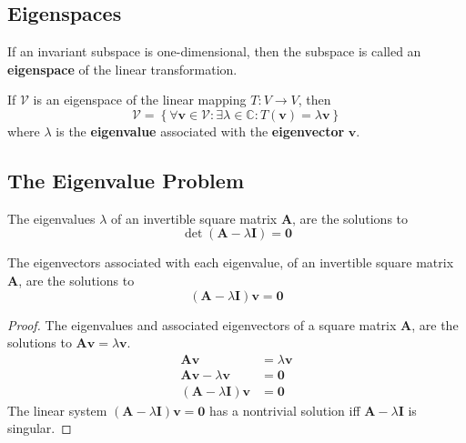 \documentclass{article}
\begin{document}
\subsection{Eigenspaces}
\begin{definition}
    If an invariant subspace is one-dimensional, then the subspace is
    called an \textbf{eigenspace} of the linear transformation.
\end{definition}
\begin{theorem}
    If \(\mathcal{V}\) is an eigenspace of the linear mapping
    \(T: V \rightarrow V\), then
    \begin{equation*}
        \mathcal{V} = \left\{ \forall \symbf{v}\in \mathcal{V}:\exists \lambda \in \mathbb{C}:T\left(\symbf{v}\right)=\lambda \symbf{v} \right\}
    \end{equation*}
    where \(\lambda\) is the \textbf{eigenvalue} associated with the
    \textbf{eigenvector} \(\symbf{v}\).
\end{theorem}
\subsection{The Eigenvalue Problem}
\begin{theorem}
    The eigenvalues \(\lambda\) of an invertible square matrix
    \(\symbf{A}\), are the solutions to
    \begin{equation*}
        \det{\left( \symbf{A} - \lambda \symbf{I} \right)}=\symbf{0}
    \end{equation*}
\end{theorem}
\begin{theorem}
    The eigenvectors associated with each eigenvalue, of an invertible
    square matrix \(\symbf{A}\), are the solutions to
    \begin{equation*}
        \left( \symbf{A} - \lambda \symbf{I} \right) \symbf{v}=\symbf{0}
    \end{equation*}
\end{theorem}
\begin{proof}
    The eigenvalues and associated eigenvectors of a square matrix
    \(\symbf{A}\), are the solutions to
    \(\symbf{A}\symbf{v}=\lambda \symbf{v}\).
    \begin{align*}
        \symbf{A}\symbf{v}                                     & =\lambda \symbf{v} \\
        \symbf{A}\symbf{v} - \lambda \symbf{v}                 & =\symbf{0}         \\
        \left( \symbf{A} - \lambda \symbf{I} \right) \symbf{v} & =\symbf{0}
    \end{align*}
    The linear system
    \(\left( \symbf{A} - \lambda\symbf{I} \right) \symbf{v}=\symbf{0}\)
    has a nontrivial solution iff \(\symbf{A} - \lambda \symbf{I}\)
    is singular.
\end{proof}
\end{document}
